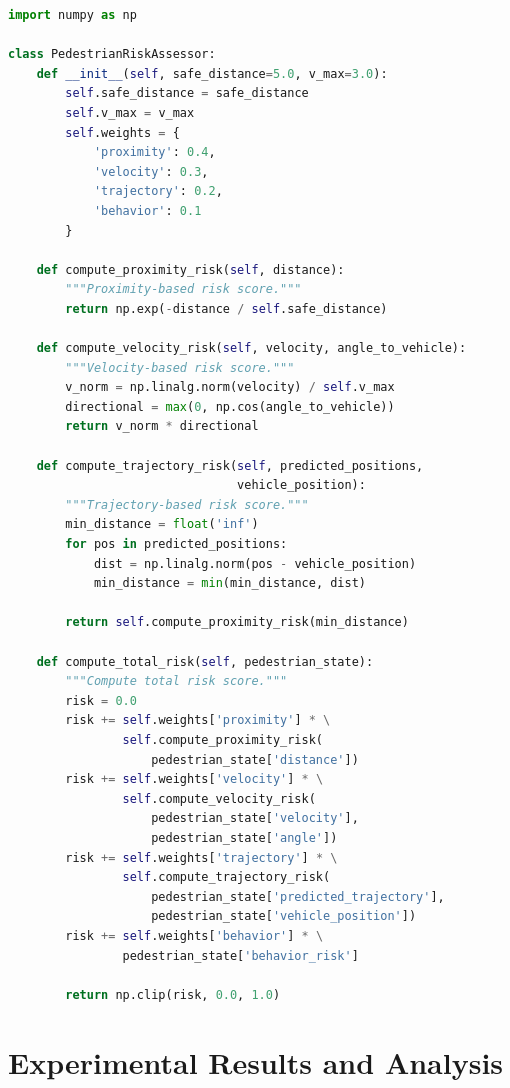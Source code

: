 \documentclass[11pt,a4paper]{article}
\begin{document}
\begin{lstlisting}[language=Python, caption=Risk Assessment Example]
import numpy as np

class PedestrianRiskAssessor:
    def __init__(self, safe_distance=5.0, v_max=3.0):
        self.safe_distance = safe_distance
        self.v_max = v_max
        self.weights = {
            'proximity': 0.4,
            'velocity': 0.3,
            'trajectory': 0.2,
            'behavior': 0.1
        }
    
    def compute_proximity_risk(self, distance):
        """Proximity-based risk score."""
        return np.exp(-distance / self.safe_distance)
    
    def compute_velocity_risk(self, velocity, angle_to_vehicle):
        """Velocity-based risk score."""
        v_norm = np.linalg.norm(velocity) / self.v_max
        directional = max(0, np.cos(angle_to_vehicle))
        return v_norm * directional
    
    def compute_trajectory_risk(self, predicted_positions, 
                                vehicle_position):
        """Trajectory-based risk score."""
        min_distance = float('inf')
        for pos in predicted_positions:
            dist = np.linalg.norm(pos - vehicle_position)
            min_distance = min(min_distance, dist)
        
        return self.compute_proximity_risk(min_distance)
    
    def compute_total_risk(self, pedestrian_state):
        """Compute total risk score."""
        risk = 0.0
        risk += self.weights['proximity'] * \
                self.compute_proximity_risk(
                    pedestrian_state['distance'])
        risk += self.weights['velocity'] * \
                self.compute_velocity_risk(
                    pedestrian_state['velocity'],
                    pedestrian_state['angle'])
        risk += self.weights['trajectory'] * \
                self.compute_trajectory_risk(
                    pedestrian_state['predicted_trajectory'],
                    pedestrian_state['vehicle_position'])
        risk += self.weights['behavior'] * \
                pedestrian_state['behavior_risk']
        
        return np.clip(risk, 0.0, 1.0)
\end{lstlisting}

\section{Experimental Results and Analysis}
\end{document}
